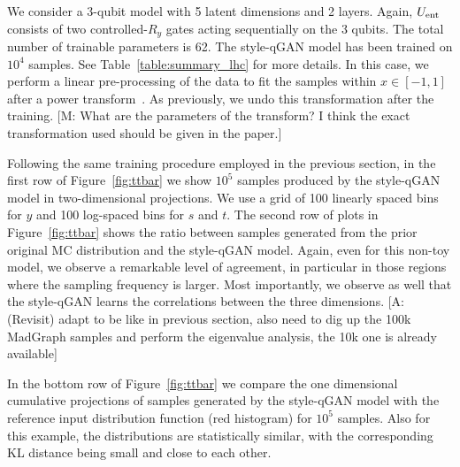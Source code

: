 \documentclass[twocolumn,preprintnumbers,superscriptaddress]{revtex4-2}
\newcommand{\commentMC}[1]{{\color{magenta} {[M: #1]}}}
\newcommand{\commentAF}[1]{{\color{cyan} {[A: #1]}}}
\begin{document}
We consider a 3-qubit model with 5 latent dimensions and 2 layers. Again,
$U_{\rm ent}$ consists of two controlled-$R_{y}$ gates acting sequentially on
the 3 qubits. The total number of trainable parameters is 62. The style-qGAN
model has been trained on $10^4$ samples. See Table~\ref{table:summary_lhc} for more details. In this case, we perform a linear pre-processing of the data
to fit the samples within $x \in [-1, 1]$ after a power
transform~\cite{yeo2000new}. As previously, we undo this transformation after
the training.
\commentMC{What are the parameters of the transform? I think the exact transformation used should be given in the paper.}

Following the same training procedure employed in the previous section, in the
first row of Figure~\ref{fig:ttbar} we show $10^5$ samples produced by the
style-qGAN model in two-dimensional projections. We use a grid of 100 linearly
spaced bins for $y$ and 100 log-spaced bins for $s$ and $t$.
%
The second row of plots in Figure~\ref{fig:ttbar} shows the ratio between
samples generated from the prior original MC distribution and the style-qGAN
model. Again, even for this non-toy model, we observe a remarkable level of agreement, in particular in those regions
where the sampling frequency is larger. Most importantly, we observe as well that the style-qGAN learns
the correlations between the three dimensions. \commentAF{(Revisit) adapt to be like in previous section, also need to dig up the 100k MadGraph samples and perform the eigenvalue analysis, the 10k one is already available}

In the bottom row of Figure~\ref{fig:ttbar} we compare the one dimensional
cumulative projections of samples generated by the style-qGAN model with the
reference input distribution function (red histogram) for $10^5$ samples. Also
for this example, the distributions are statistically similar, with the
corresponding KL distance being small and close to each other.
\end{document}
